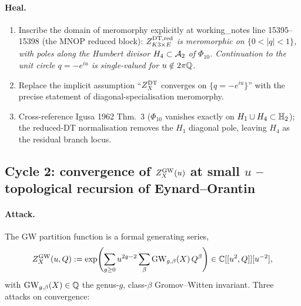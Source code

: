 \paragraph{Heal.}
\begin{enumerate}[label=(H\arabic*),leftmargin=1.5em]
\item Inscribe the domain of meromorphy explicitly at
  working\_notes line 15395--15398 (the MNOP reduced block):
  \emph{$Z^{\mathrm{DT},\mathrm{red}}_{K3\times E}$ is meromorphic on
  $\{0<|q|<1\}$, with poles along the Humbert divisor
  $H_4\subset\mathcal{A}_2$ of $\Phi_{10}$. Continuation to the unit
  circle $q=-e^{iu}$ is single-valued for $u\notin 2\pi\mathbb{Q}$.}
\item Replace the implicit assumption ``$Z^{\mathrm{DT}}_X$ converges on
  $\{q=-e^{iu}\}$'' with the precise statement of
  diagonal-specialisation meromorphy.
\item Cross-reference Igusa 1962 Thm.\ 3 ($\Phi_{10}$ vanishes
  exactly on $H_1\cup H_4\subset\mathbb{H}_2$); the reduced-DT
  normalisation removes the $H_1$ diagonal pole, leaving $H_4$
  as the residual branch locus.
\end{enumerate}

\subsection*{Cycle 2: convergence of $Z^{\mathrm{GW}}_X(u)$ at small $u$
-- topological recursion of Eynard--Orantin}
\label{sec:w14a14-cycle-2}

\paragraph{Attack.}
The GW partition function is a formal generating series,
\[
Z^{\mathrm{GW}}_X(u,Q):=\exp\Biggl(\sum_{g\ge 0}u^{2g-2}\sum_{\beta}
\mathrm{GW}_{g,\beta}(X)\,Q^\beta\Biggr)\in\mathbb{C}[[u^2,Q]][u^{-2}],
\]
with $\mathrm{GW}_{g,\beta}(X)\in\mathbb{Q}$ the genus-$g$, class-$\beta$
Gromov--Witten invariant. Three attacks on convergence:

